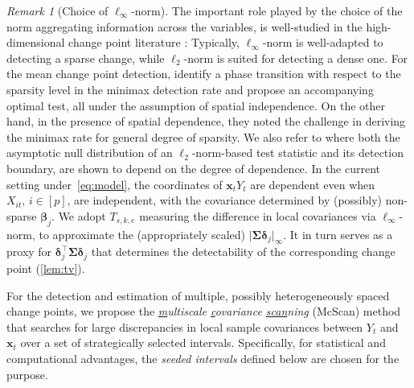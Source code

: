 \documentclass[11pt, a4paper]{article}
\newcommand{\mbf}{\mathbf}
\theoremstyle{definition}
\theoremstyle{definition}
\theoremstyle{definition}
\theoremstyle{definition}
\theoremstyle{definition}
\theoremstyle{remark}
\newtheorem{rem}{Remark}[section]
\theoremstyle{definition}
\theoremstyle{definition}
\theoremstyle{definition}
\begin{document}
\begin{rem}[Choice of $\ell_\infty$-norm]
\label{rem:norm}
The important role played by the choice of the norm aggregating information across the variables, is well-studied in the high-dimensional change point literature \citep{cho2021data}: Typically, $\ell_\infty$-norm is well-adapted to detecting a sparse change, while $\ell_2$-norm is suited for detecting a dense one. For the mean change point detection, \cite{liu2021minimax} identify a phase transition with respect to the sparsity level in the minimax detection rate and propose an accompanying optimal test, all under the assumption of spatial independence. On the other hand, in the presence of spatial dependence, they noted the challenge in deriving the minimax rate for general degree of sparsity. We also refer to \cite{horvath2022detecting} where both the asymptotic null distribution of an $\ell_2$-norm-based test statistic and its detection boundary, are shown to depend on the degree of dependence.
In the current setting under~\eqref{eq:model}, the coordinates of $\mbf x_t Y_t$ are dependent even when $X_{it}, \, i \in [p]$, are independent, with the covariance determined by (possibly) non-sparse $\bm\beta_j$. We adopt $T_{s, k, e}$ measuring the difference in local covariances via $\ell_\infty$-norm, to approximate the (appropriately scaled) $\vert \bm\Sigma \bm\delta_j \vert_\infty$. It in turn serves as a proxy for $\bm\delta_j^\top \bm\Sigma \bm\delta_j$ that determines the detectability of the corresponding change point (\cref{lem:tv}).
\end{rem}
For the detection and estimation of multiple, possibly heterogeneously spaced change points, we propose the \emph{\underline{m}ultiscale \underline{c}ovariance \underline{scan}ning} (McScan) method that searches for large discrepancies in local sample covariances between $Y_t$ and $\mbf x_t$ over a set of strategically selected intervals.
Specifically, for statistical and computational advantages, the \emph{seeded intervals} \citep{kovacs2020seeded} defined below are chosen for the purpose.
\end{document}
